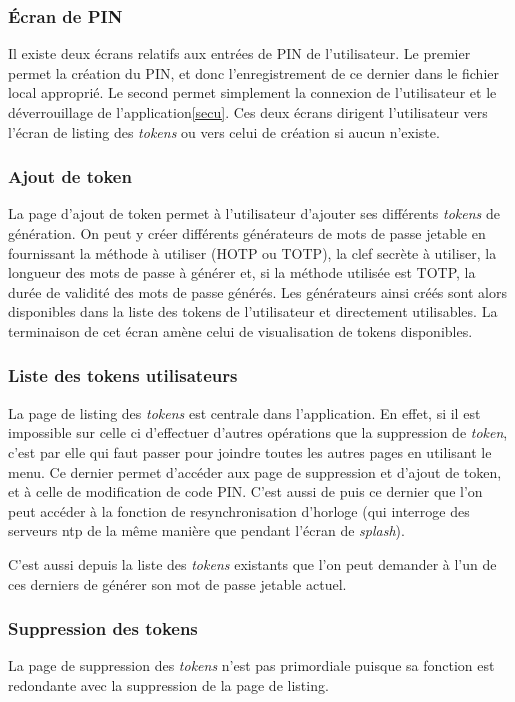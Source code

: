 \subsubsection{Écran de PIN}
Il existe deux écrans relatifs aux entrées de PIN de l'utilisateur. Le premier permet la création
du PIN, et donc l'enregistrement de ce dernier dans le fichier local approprié. Le second permet
simplement la connexion de l'utilisateur et le déverrouillage de l'application\ref{secu}. Ces deux
écrans dirigent l'utilisateur vers l'écran de listing des \emph{tokens} ou vers celui de création 
si aucun n'existe.

\subsubsection{Ajout de token}
La page d'ajout de token permet à l'utilisateur d'ajouter ses différents \emph{tokens} de
génération. On peut y créer différents générateurs de mots de passe jetable en fournissant la 
méthode à utiliser (HOTP ou TOTP), la clef secrète à utiliser, la longueur des mots de passe à
générer et, si la méthode utilisée est TOTP, la durée de validité des mots de passe générés. Les 
générateurs ainsi créés sont alors disponibles dans la liste des tokens de l'utilisateur et 
directement utilisables. La terminaison de cet écran amène celui de visualisation de tokens
disponibles.

\subsubsection{Liste des tokens utilisateurs}
La page de listing des \emph{tokens} est centrale dans l'application. En effet, si il est impossible sur
celle ci d'effectuer d'autres opérations que la suppression de \emph{token}, c'est par elle qui faut 
passer pour joindre toutes les autres pages en utilisant le menu. Ce dernier permet d'accéder aux page
de suppression et d'ajout de token, et à celle de modification de code PIN. C'est aussi de puis ce
dernier que l'on peut accéder à la fonction de resynchronisation d'horloge (qui interroge des serveurs
ntp de la même manière que pendant l'écran de \emph{splash}).

C'est aussi depuis la liste des \emph{tokens} existants que l'on peut demander à l'un de ces derniers 
de générer son mot de passe jetable actuel.

\subsubsection{Suppression des tokens}
La page de suppression des \emph{tokens} n'est pas primordiale puisque sa fonction est redondante avec
la suppression de la page de listing.

